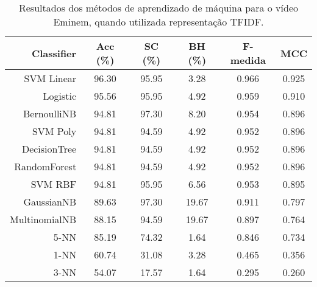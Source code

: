 \begin{table}[!htb]
\centering
\caption{Resultados dos métodos de aprendizado de máquina para o vídeo Eminem, quando utilizada representação TFIDF.}
\label{tab:Eminem-tfidf}
\begin{tabular}{r|c|c|c|c|c}
\hline\hline
Classifier & Acc (\%) & SC (\%) & BH (\%) & F-medida & MCC \\ \hline
SVM Linear & 96.30 & 95.95 & 3.28 & 0.966 & 0.925 & \\
Logistic & 95.56 & 95.95 & 4.92 & 0.959 & 0.910 & \\
BernoulliNB & 94.81 & 97.30 & 8.20 & 0.954 & 0.896 & \\
SVM Poly & 94.81 & 94.59 & 4.92 & 0.952 & 0.896 & \\
DecisionTree & 94.81 & 94.59 & 4.92 & 0.952 & 0.896 & \\
RandomForest & 94.81 & 94.59 & 4.92 & 0.952 & 0.896 & \\
SVM RBF & 94.81 & 95.95 & 6.56 & 0.953 & 0.895 & \\
GaussianNB & 89.63 & 97.30 & 19.67 & 0.911 & 0.797 & \\
MultinomialNB & 88.15 & 94.59 & 19.67 & 0.897 & 0.764 & \\
5-NN & 85.19 & 74.32 & 1.64 & 0.846 & 0.734 & \\
1-NN & 60.74 & 31.08 & 3.28 & 0.465 & 0.356 & \\
3-NN & 54.07 & 17.57 & 1.64 & 0.295 & 0.260 & \\
\hline\hline
\end{tabular}
\end{table}
